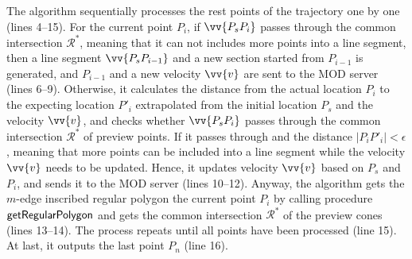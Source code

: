 The algorithm sequentially processes the rest points of the trajectory one by one (lines 4--15). 
For the current point $P_{i}$, if $\vv{P_sP_{i}}$ passes through the common intersection $\mathcal{R}^*$, meaning that it can not includes more points into a line segment, then a line segment $\vv{P_sP_{i-1}}$ and a new section started from  $P_{i-1}$ is generated, and $P_{i-1}$ and a new velocity $\vv{v}$ are sent to the MOD server (lines 6--9).
%
Otherwise, it calculates the distance from the actual location $P_{i}$ to the expecting location $P'_{i}$ extrapolated from the initial location $P_s$ and the velocity $\vv{v}$, and checks whether $\vv{P_sP_{i}}$ passes through the common intersection $\mathcal{R}^*$ of preview points.
If it passes through and the distance $|P_{i}P'_{i}|<\epsilon$, meaning that more points can be included into a line segment while the velocity $\vv{v}$ needs to be updated. Hence, it updates velocity $\vv{v}$ based on $P_s$ and $P_{i}$, and sends it to the MOD server (lines 10--12). 
%
Anyway, the algorithm gets the $m$-edge inscribed regular polygon \wrt the current point $P_{i}$ by calling procedure ${\mathsf{getRegularPolygon}}$ \cite{Lin:Cised} and gets the common intersection $\mathcal{R}^*$ of the preview cones (lines 13--14). The process repeats until all points have been processed (line 15).
At last, it outputs the last point $P_{n}$ (line 16).




